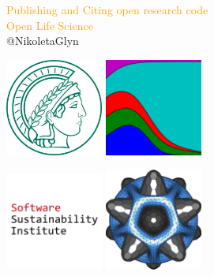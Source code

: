 \documentclass{beamer}
\begin{document}
\begin{frame}
    \begin{center}
        \Large{\textcolor{orange}{\textcolor{orange}{Publishing and Citing open research code \\ Open Life Science}}} \\

        \vspace{1cm}
        \normalsize{@NikoletaGlyn}

    \end{center}
\end{frame}

\begin{frame}
    \begin{center}
    \includegraphics[width=0.24\textwidth]{static/mpi.jpg}\hspace{8pt}
    \includegraphics[width=0.24\textwidth]{static/axelrod-logo.png}\vspace{8pt}

    \includegraphics[width=0.24\textwidth]{static/ssi-logo.png}\hspace{8pt}
    \includegraphics[width=0.24\textwidth]{static/JOSS.png}
    \end{center}
\end{frame}
\end{document}

